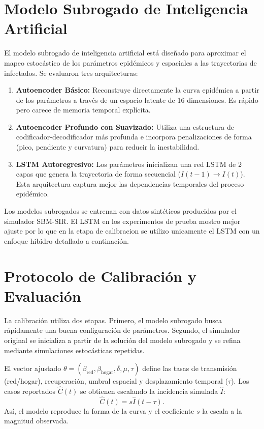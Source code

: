 \documentclass[12pt,a4paper,twocolumn]{article}
\begin{document}
\section*{Modelo Subrogado de Inteligencia Artificial}

El modelo subrogado de inteligencia artificial está diseñado para aproximar el mapeo estocástico de los parámetros epidémicos y espaciales a las trayectorias de infectados. Se evaluaron tres arquitecturas:
\begin{enumerate}
    \item \textbf{Autoencoder Básico:} Reconstruye directamente la curva epidémica a partir de los parámetros a través de un espacio latente de 16 dimensiones. Es rápido pero carece de memoria temporal explícita.
    \item \textbf{Autoencoder Profundo con Suavizado:} Utiliza una estructura de codificador-decodificador más profunda e incorpora penalizaciones de forma (pico, pendiente y curvatura) para reducir la inestabilidad.
    \item \textbf{LSTM Autoregresivo:} Los parámetros inicializan una red LSTM de 2 capas que genera la trayectoria de forma secuencial ($I(t-1) \rightarrow I(t)$). Esta arquitectura captura mejor las dependencias temporales del proceso epidémico.
\end{enumerate}

Los modelos subrogados se entrenan con datos sintéticos producidos por el simulador SBM-SIR. El LSTM en los experimentos de prueba mostro mejor ajuste por lo que en la etapa de calibracion se utilizo unicamente el LSTM con un enfoque hibidro detallado a continación. 

\section*{Protocolo de Calibración y Evaluación}

La calibración utiliza dos etapas. Primero, el modelo subrogado busca rápidamente una buena configuración de parámetros. Segundo, el simulador original se inicializa a partir de la solución del modelo subrogado y se refina mediante simulaciones estocásticas repetidas.

El vector ajustado $\theta=(\beta_{\mathrm{red}},\beta_{\mathrm{hogar}},\delta,\mu,\tau)$ define las tasas de transmisión (red/hogar), recuperación, umbral espacial y desplazamiento temporal ($\tau$). Los casos reportados $\hat C(t)$ se obtienen escalando la incidencia simulada $\hat I$:
\[
\hat C(t)=s\hat I(t-\tau).
\]
Así, el modelo reproduce la forma de la curva y el coeficiente $s$ la escala a la magnitud observada.
\end{document}
